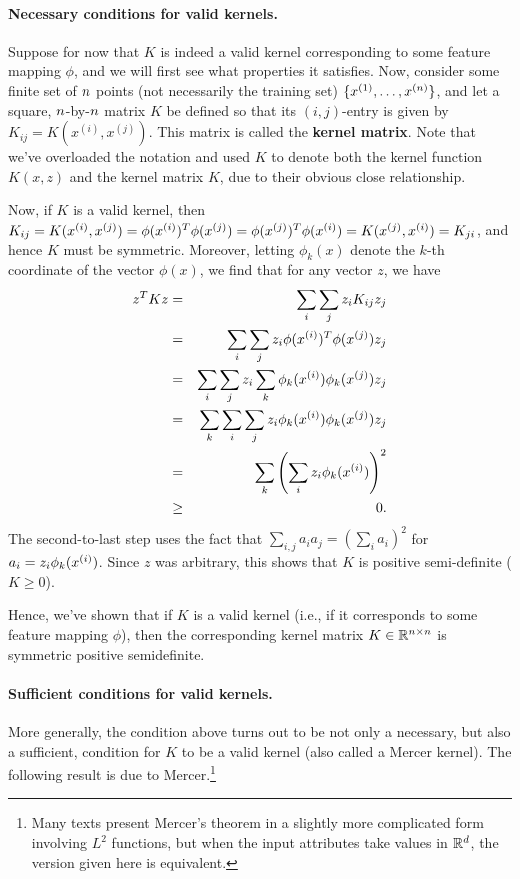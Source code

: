 \documentclass{article}
\begin{document}
\paragraph{Necessary conditions for valid kernels.}
Suppose for now that $K$ is indeed a valid kernel corresponding to some feature mapping $\phi$, and we will first see what properties it satisfies. 
Now, consider some finite set of ${n}$ points (not necessarily the training set)
$\{x^{(1)}, \ldots, x^{({n})}\}$, and let a square, ${n}$-by-${n}$ matrix $K$ be defined so that
its $(i,j)$-entry is given by $K_{ij} = K(x^{(i)}, x^{(j)})$.  This matrix is called the {\bf kernel matrix}.
Note that we've overloaded the notation and used $K$ to denote both the kernel function $K(x,z)$
and the kernel matrix $K$, due to their obvious close relationship.

Now, if $K$ is a valid kernel, then $K_{ij} = K({x^{(i)}},{x^{(j)}}) =
\phi({x^{(i)}})^T\phi({x^{(j)}})
= \phi({x^{(j)}})^T\phi({x^{(i)}}) = K({x^{(j)}},{x^{(i)}}) = K_{ji}$, and hence $K$ must be symmetric.
Moreover, letting $\phi_k(x)$ denote the $k$-th coordinate of the
vector $\phi(x)$, we find that for any vector $z$, we have
\begin{eqnarray*}
	z^T K z &=& \sum_{i} \sum_{j} z_i K_{ij} z_j \\
	&=& \sum_i \sum_j z_i \phi({x^{(i)}})^T \phi({x^{(j)}}) z_j \\
	&=& \sum_i \sum_j z_i \sum_k \phi_k({x^{(i)}}) \phi_k({x^{(j)}}) z_j \\
	&=& \sum_k \sum_i \sum_j z_i \phi_k({x^{(i)}}) \phi_k({x^{(j)}}) z_j \\
	&=& \sum_k \left( \sum_i z_i \phi_k({x^{(i)}}) \right)^2\\
	&\geq& 0.
\end{eqnarray*}
The second-to-last step uses the fact that $\sum_{i,j}a_ia_j = (\sum_i a_i)^2$ for $a_i = z_i \phi_k({x^{(i)}})$.  Since
$z$ was arbitrary, this shows that $K$ is positive semi-definite ($K \geq 0$).

Hence, we've shown that if $K$ is a valid kernel (i.e., if it corresponds to some feature
mapping $\phi$), then the corresponding kernel matrix $K \in {\mathbb R}^{{n}\times {n}}$ is symmetric
positive semidefinite. 

\paragraph{Sufficient conditions for valid kernels. } More generally, the condition above turns out to be not only a necessary, but
also a sufficient, condition for $K$ to be a valid kernel (also called a Mercer kernel).
The following result is due to Mercer.\footnote{Many texts present Mercer's
	theorem in a slightly more complicated form involving $L^2$ functions, but
	when the input attributes take values in ${\mathbb R}^{d}$,
	the version given here is equivalent.}
\end{document}

